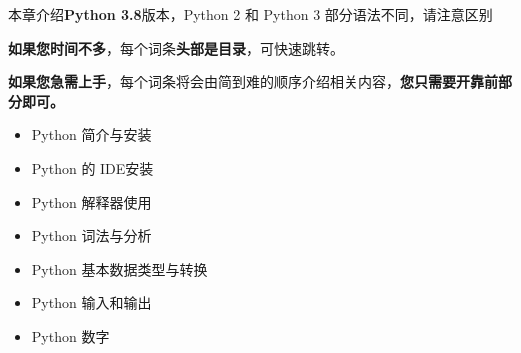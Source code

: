 
\begin{issues}
\issueTODO
\end{issues}

本章介绍\textbf{Python 3.8}版本，Python 2 和 Python 3 部分语法不同，请注意区别

\textbf{如果您时间不多}，每个词条\textbf{头部是目录}，可快速跳转。

\textbf{如果您急需上手}，每个词条将会由简到难的顺序介绍相关内容，\textbf{您只需要开靠前部分即可。}

\begin{itemize}
\item Python 简介与安装
\item Python 的 IDE安装
\item Python 解释器使用
\item Python 词法与分析
\item Python 基本数据类型与转换
\item Python 输入和输出
\item Python 数字
\end{itemize}
